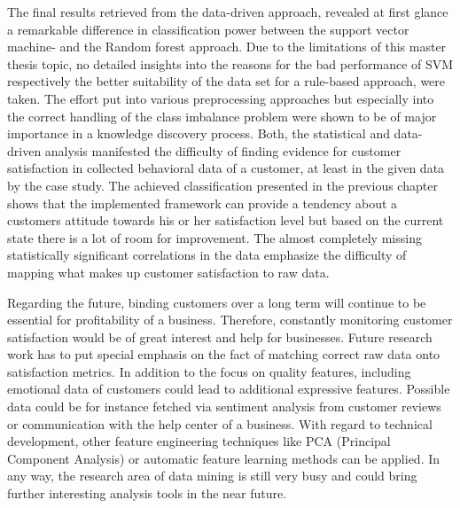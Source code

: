 The final results retrieved from the data-driven approach, revealed at first glance a remarkable difference in classification power between the support vector machine- and the Random forest approach. Due to the limitations of this master thesis topic, no detailed insights into the reasons for the bad performance of SVM respectively the better suitability of the data set for a rule-based approach, were taken. The effort put into various preprocessing approaches but especially into the correct handling of the class imbalance problem were shown to be of major importance in a knowledge discovery process. Both, the statistical and data-driven analysis manifested the difficulty of finding evidence for customer satisfaction in collected behavioral data of a customer, at least in the given data by the case study. The achieved classification presented in the previous chapter shows that the implemented framework can provide a tendency about a customers attitude towards his or her satisfaction level but based on the current state there is a lot of room for improvement. The almost completely missing statistically significant correlations in the data emphasize the difficulty of mapping what makes up customer satisfaction to raw data. 

Regarding the future, binding customers over a long term will continue to be essential for profitability of a business. Therefore, constantly monitoring customer satisfaction would be of great interest and help for businesses. Future research work has to put special emphasis on the fact of matching correct raw data onto satisfaction metrics. In addition to the focus on quality features, including emotional data of customers could lead to additional expressive features. Possible data could be for instance fetched via sentiment analysis from customer reviews or communication with the help center of a business. With regard to technical development, other feature engineering techniques like PCA (Principal Component Analysis) or automatic feature learning methods can be applied. In any way, the research area of data mining is still very busy and could bring further interesting analysis tools in the near future. 